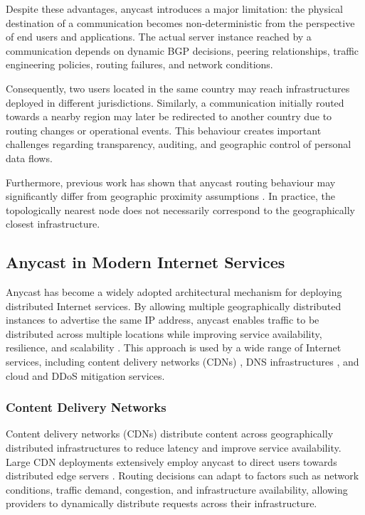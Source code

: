 \documentclass[
A4paper,                %
twoside,                %
openright,              %
chapterprefix=true,     %
12pt,                   %
headings=normal,        %
titlepage=on            %
]{book}
\begin{document}
Despite these advantages, anycast introduces a major limitation: the physical destination of a communication becomes non-deterministic from the perspective of end users and applications. The actual server instance reached by a communication depends on dynamic BGP decisions, peering relationships, traffic engineering policies, routing failures, and network conditions.

Consequently, two users located in the same country may reach infrastructures deployed in different jurisdictions. Similarly, a communication initially routed towards a nearby region may later be redirected to another country due to routing changes or operational events. This behaviour creates important challenges regarding transparency, auditing, and geographic control of personal data flows.

Furthermore, previous work has shown that anycast routing behaviour may significantly differ from geographic proximity assumptions \cite{Bian2019TowardsPeering,Calder2015AnalyzingCDN}. In practice, the topologically nearest node does not necessarily correspond to the geographically closest infrastructure.

\subsection{Anycast in Modern Internet Services}
\label{sc:background_internet_routing_anycast_modern}

Anycast has become a widely adopted architectural mechanism for deploying distributed Internet services. By allowing multiple geographically distributed instances to advertise the same IP address, anycast enables traffic to be distributed across multiple locations while improving service availability, resilience, and scalability \cite{Hinden2003InternetArchitecture,McPherson2014ArchitecturalAnycast}. This approach is used by a wide range of Internet services, including content delivery networks (CDNs) \cite{Calder2015AnalyzingCDN}, DNS infrastructures \cite{Abley2006OperationServices}, and cloud and DDoS mitigation services.

\subsubsection{Content Delivery Networks}
\label{sc:background_internet_routing_anycast_modern_cdns}

Content delivery networks (CDNs) distribute content across geographically distributed infrastructures to reduce latency and improve service availability. Large CDN deployments extensively employ anycast to direct users towards distributed edge servers \cite{Calder2015AnalyzingCDN}. Routing decisions can adapt to factors such as network conditions, traffic demand, congestion, and infrastructure availability, allowing providers to dynamically distribute requests across their infrastructure.
\end{document}
